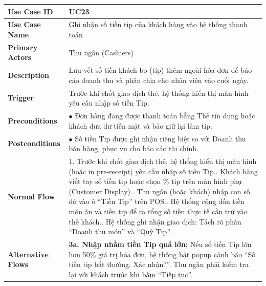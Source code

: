 \begin{longtable}{|p{3.5cm}|p{12.5cm}|}
\hline
\textbf{Use Case ID} & UC23 \\ \hline
\textbf{Use Case Name} & Ghi nhận số tiền tip của khách hàng vào hệ thống thanh toán \\ \hline
\textbf{Primary Actors} & Thu ngân (Cashiers) \\ \hline
\textbf{Description} & Lưu vết số tiền khách bo (tip) thêm ngoài hóa đơn để báo cáo doanh thu và phân chia cho nhân viên vào cuối ngày. \\ \hline
\textbf{Trigger} & Trước khi chốt giao dịch thẻ, hệ thống hiển thị màn hình yêu cầu nhập số tiền Tip. \\ \hline
\textbf{Preconditions} &
$\bullet$ Đơn hàng đang được thanh toán bằng Thẻ tín dụng hoặc khách đưa dư tiền mặt và bảo giữ lại làm tip. \\ \hline
\textbf{Postconditions} & $\bullet$ Số tiền Tip được ghi nhận riêng biệt so với Doanh thu bán hàng, phục vụ cho báo cáo tài chính. \\ \hline
\textbf{Normal Flow} &
1. Trước khi chốt giao dịch thẻ, hệ thống hiển thị màn hình (hoặc in pre-receipt) yêu cầu nhập số tiền Tip.\newline
2. Khách hàng viết tay số tiền tip hoặc chọn \% tip trên màn hình phụ (Customer Display).\newline
3. Thu ngân (hoặc khách) nhập con số đó vào ô ``Tiền Tip'' trên POS.\newline
4. Hệ thống cộng dồn tiền món ăn và tiền tip để ra tổng số tiền thực tế cần trừ vào thẻ khách.\newline
5. Hệ thống ghi nhận giao dịch: Tách rõ phần ``Doanh thu món'' và ``Quỹ Tip''. \\ \hline
\textbf{Alternative Flows} &
\textbf{3a. Nhập nhầm tiền Tip quá lớn:} Nếu số tiền Tip lớn hơn 50\% giá trị hóa đơn, hệ thống bật popup cảnh báo ``Số tiền tip bất thường. Xác nhận?''. Thu ngân phải kiểm tra lại với khách trước khi bấm ``Tiếp tục''. \\ \hline
\end{longtable}

